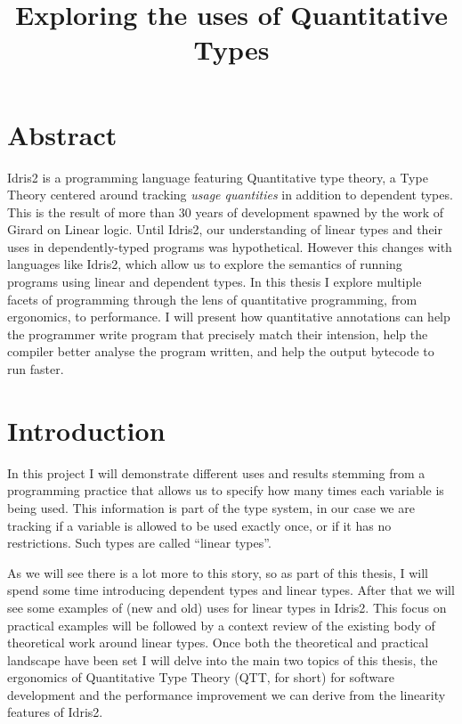 \documentclass[
]{article}
\author{}
\date{}
\begin{document}
\title{Exploring the uses of Quantitative Types}
\maketitle

\hypertarget{abstract}{%
\section{Abstract}\label{abstract}}

Idris2 is a programming language featuring Quantitative type
theory\cite{qtt}, a Type Theory centered around tracking \emph{usage
quantities} in addition to dependent types. This is the result of more
than 30 years of development spawned by the work of Girard on Linear
logic\cite{linear-logic}. Until Idris2, our understanding of linear
types and their uses in dependently-typed programs was hypothetical.
However this changes with languages like Idris2, which allow us to
explore the semantics of running programs using linear and dependent
types. In this thesis I explore multiple facets of programming through
the lens of quantitative programming, from ergonomics, to performance. I
will present how quantitative annotations can help the programmer write
program that precisely match their intension, help the compiler better
analyse the program written, and help the output bytecode to run faster.

\newpage
\setcounter{secnumdepth}{1}
\tableofcontents
\newpage

\hypertarget{introduction}{%
\section{Introduction}\label{introduction}}

In this project I will demonstrate different uses and results stemming
from a programming practice that allows us to specify how many times
each variable is being used. This information is part of the type
system, in our case we are tracking if a variable is allowed to be used
exactly once, or if it has no restrictions. Such types are called
``linear types''.

As we will see there is a lot more to this story, so as part of this
thesis, I will spend some time introducing dependent types and linear
types. After that we will see some examples of (new and old) uses for
linear types in Idris2. This focus on practical examples will be
followed by a context review of the existing body of theoretical work
around linear types. Once both the theoretical and practical landscape
have been set I will delve into the main two topics of this thesis, the
ergonomics of Quantitative Type Theory\cite{qtt}\cite{nuttin} (QTT, for
short) for software development and the performance improvement we can
derive from the linearity features of Idris2.
\end{document}
